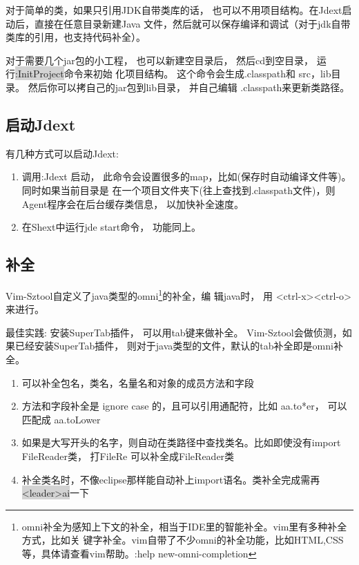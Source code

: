 \documentclass[oneside,openany]{book}
\begin{document}
   对于简单的类，如果只引用JDK自带类库的话， 也可以不用项目结构。在Jdext启动后，直接在任意目录新建Java
文件，然后就可以保存编译和调试（对于jdk自带类库的引用，也支持代码补全）。
  
   对于需要几个jar包的小工程， 也可以新建空目录后， 然后cd到空目录， 运行\colorbox{lightgray}{:InitProject}命令来初始
化项目结构。 这个命令会生成.classpath和 src，lib目录。 然后你可以拷自己的jar包到lib目录， 并自己编辑
.classpath来更新类路径。

\subsection{启动Jdext}
   有几种方式可以启动Jdext:
    \begin{enumerate}
      \item 调用:Jdext 启动， 此命令会设置很多的map，比如(保存时自动编译文件等)。 同时如果当前目录是
  在一个项目文件夹下(往上查找到.classpath文件)，则Agent程序会在后台缓存类信息， 以加快补全速度。
      \item 在Shext中运行jde start命令， 功能同上。
    \end{enumerate}

\subsection{补全}
    Vim-Sztool自定义了java类型的omni\footnote{omni补全为感知上下文的补全，相当于IDE里的智能补全。vim里有多种补全方式，比如关
    键字补全。vim自带了不少omni的补全功能，比如HTML,CSS等，具体请查看vim帮助。:help new-omni-completion }的补全，编
    辑java时， 用 <ctrl-x><ctrl-o> 来进行。
    \begin{mdframed}[style=BestPracticeFrame]
      最佳实践: 安装SuperTab插件， 可以用tab键来做补全。
      Vim-Sztool会做侦测，如果已经安装SuperTab插件， 则对于java类型的文件，默认的tab补全即是omni补全。
    \end{mdframed}

    \begin{enumerate}
      \item 可以补全包名，类名，名量名和对象的成员方法和字段
      \item 方法和字段补全是 ignore case 的，且可以引用通配符，比如 aa.to*er， 可以匹配成 aa.toLower
      \item 如果是大写开头的名字，则自动在类路径中查找类名。比如即使没有import FileReader类， 打FileRe 可以补全成FileReader类 
      \item 补全类名时，不像eclipse那样能自动补上import语名。类补全完成需再\colorbox{lightgray}{<leader>ai}一下
    \end{enumerate}
    
\end{document}
